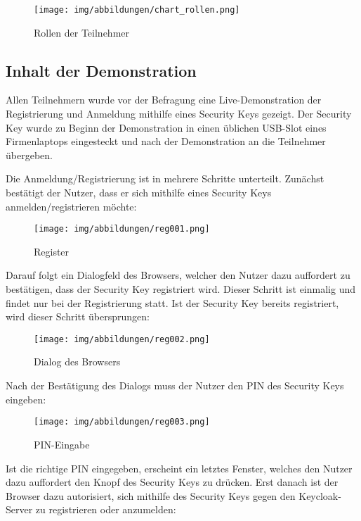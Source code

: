 \begin{figure}[h]
	\centering 
	\texttt{[image: img/abbildungen/chart\_rollen.png]}
	\captionsetup{format=hang}
	\caption{Rollen der Teilnehmer} \label{roles}
\end{figure}

\subsection{Inhalt der Demonstration}
Allen Teilnehmern wurde vor der Befragung eine Live-Demonstration der Registrierung und Anmeldung mithilfe eines Security Keys gezeigt. Der Security Key wurde zu Beginn der Demonstration in einen üblichen USB-Slot eines Firmenlaptops eingesteckt und nach der Demonstration an die Teilnehmer übergeben. 

Die Anmeldung/Registrierung ist in mehrere Schritte unterteilt. Zunächst bestätigt der Nutzer, dass er sich mithilfe eines Security Keys anmelden/registrieren möchte:

\begin{figure}[h]
	\centering 
	\texttt{[image: img/abbildungen/reg001.png]}
	\captionsetup{format=hang}
	\caption{Register}
\end{figure}

Darauf folgt ein Dialogfeld des Browsers, welcher den Nutzer dazu auffordert zu bestätigen, dass der Security Key registriert wird. Dieser Schritt ist einmalig und findet nur bei der Registrierung statt. Ist der Security Key bereits registriert, wird dieser Schritt übersprungen:

\begin{figure}[H]
	\centering 
	\texttt{[image: img/abbildungen/reg002.png]}
	\captionsetup{format=hang}
	\caption{Dialog des Browsers}
\end{figure}

Nach der Bestätigung des Dialogs muss der Nutzer den PIN des Security Keys eingeben:

\begin{figure}[H]
	\centering 
	\texttt{[image: img/abbildungen/reg003.png]}
	\captionsetup{format=hang}
	\caption{PIN-Eingabe}
\end{figure}

Ist die richtige PIN eingegeben, erscheint ein letztes Fenster, welches den Nutzer dazu auffordert den Knopf des Security Keys zu drücken. Erst danach ist der Browser dazu autorisiert, sich mithilfe des Security Keys gegen den Keycloak-Server zu registrieren oder anzumelden:

